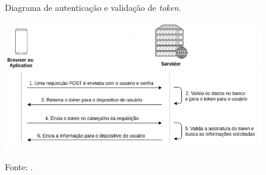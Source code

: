 \begin{figure}[H]
	\caption{Diagrama de autenticação e validação de \textit{token}.}
	\centering %
	\includegraphics[width=14cm]{resources/jwt-schema.png} %
	\label{figura:jwt-schema}
	\captionsetup{singlelinecheck = false, format= hang, justification=raggedright, labelsep=space, width=14cm}
	\caption*{\footnotesize Fonte: .}
\end{figure}

